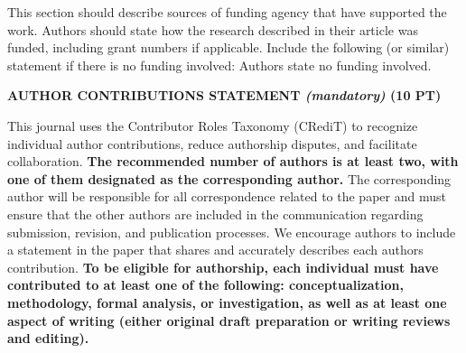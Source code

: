 \documentclass[
]{article}
\begin{document}
This section should describe sources of funding agency that have supported the work. Authors should state how the research described in their article was funded, including grant numbers if applicable. Include the following (or similar) statement if there is no funding involved:
Authors state no funding involved.

\textbf{AUTHOR CONTRIBUTIONS STATEMENT \emph{(mandatory)} (10 PT)}

This journal uses the Contributor Roles Taxonomy (CRediT) to recognize individual author contributions, reduce authorship disputes, and facilitate collaboration. \textbf{The recommended number of authors is at least two, with one of them designated as the corresponding author.} The corresponding author will be responsible for all correspondence related to the paper and must ensure that the other authors are included in the communication regarding submission, revision, and publication processes. We encourage authors to include a statement in the paper that shares and accurately describes each author\textquotesingle s contribution. \textbf{To be eligible for authorship, each individual must have contributed to at least one of the following: conceptualization, methodology, formal analysis, or investigation, as well as at least one aspect of writing (either original draft preparation or writing reviews and editing).}
\end{document}
